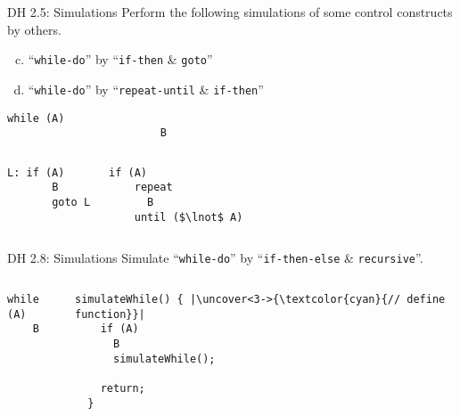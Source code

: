 \begin{frame}[fragile]{}
  \begin{exampleblock}{DH 2.5: Simulations}
    Perform the following simulations of some control constructs by others.
    \begin{enumerate}[(a)]
      \setcounter{enumi}{(2)}
      \item ``\texttt{while-do}'' by ``\texttt{if-then} \& \texttt{goto}''
      \item ``\texttt{while-do}'' by ``\texttt{repeat-until} \& \texttt{if-then}''
    \end{enumerate}
  \end{exampleblock}

  \begin{lstlisting}[style = Cstyle, backgroundcolor = \color{teal!10!lightgray}]
                      while (A)
                        B
  \end{lstlisting}

  \begin{columns}
      \pause
      \begin{lstlisting}[style = Cstyle]
  L: if (A)
       B
       goto L
      \end{lstlisting}
      \pause
      \begin{lstlisting}[style = Cstyle]
  if (A)
    repeat
      B
    until ($\lnot$ A)
      \end{lstlisting}
  \end{columns}
\end{frame}

\begin{frame}[fragile]{}
  \begin{exampleblock}{DH 2.8: Simulations}
    Simulate ``\texttt{while-do}'' by ``\texttt{if-then-else} \& \texttt{recursive}''.
  \end{exampleblock}

  \begin{columns}
      \begin{lstlisting}[style = Cstyle, backgroundcolor = \color{teal!10!lightgray}]
  while (A)
    B
      \end{lstlisting}
      \pause
      \begin{lstlisting}[style = Cstyle]
  simulateWhile() { |\uncover<3->{\textcolor{cyan}{// define function}}|
    if (A)
      B
      simulateWhile();

    return;
  }
      \end{lstlisting}
  \end{columns}

\end{frame}

